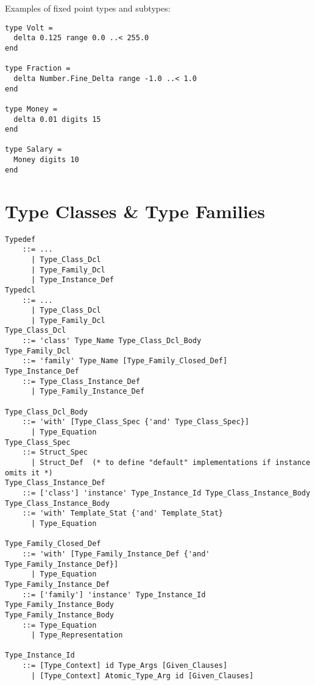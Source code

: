 \example Examples of fixed point types and subtypes:
\begin{lstlisting}
type Volt = 
  delta 0.125 range 0.0 ..< 255.0 
end 

type Fraction = 
  delta Number.Fine_Delta range -1.0 ..< 1.0 
end 

type Money = 
  delta 0.01 digits 15 
end 

type Salary = 
  Money digits 10 
end 
\end{lstlisting}





\section[Type Classes \& Type Families]{Type Classes \& Type Families}
\label{sec:type-classes}

\grammar\begin{lstlisting}
Typedef
    ::= ...
      | Type_Class_Dcl
      | Type_Family_Dcl
      | Type_Instance_Def
Typedcl
    ::= ...
      | Type_Class_Dcl
      | Type_Family_Dcl
Type_Class_Dcl
    ::= 'class' Type_Name Type_Class_Dcl_Body
Type_Family_Dcl
    ::= 'family' Type_Name [Type_Family_Closed_Def]
Type_Instance_Def
    ::= Type_Class_Instance_Def
      | Type_Family_Instance_Def
      
Type_Class_Dcl_Body 
    ::= 'with' [Type_Class_Spec {'and' Type_Class_Spec}]
      | Type_Equation
Type_Class_Spec
    ::= Struct_Spec
      | Struct_Def  (* to define "default" implementations if instance omits it *)
Type_Class_Instance_Def
    ::= ['class'] 'instance' Type_Instance_Id Type_Class_Instance_Body
Type_Class_Instance_Body 
    ::= 'with' Template_Stat {'and' Template_Stat}
      | Type_Equation
      
Type_Family_Closed_Def
    ::= 'with' [Type_Family_Instance_Def {'and' Type_Family_Instance_Def}]
      | Type_Equation
Type_Family_Instance_Def
    ::= ['family'] 'instance' Type_Instance_Id Type_Family_Instance_Body
Type_Family_Instance_Body
    ::= Type_Equation
      | Type_Representation

Type_Instance_Id
    ::= [Type_Context] id Type_Args [Given_Clauses]
      | [Type_Context] Atomic_Type_Arg id [Given_Clauses]
\end{lstlisting}



























